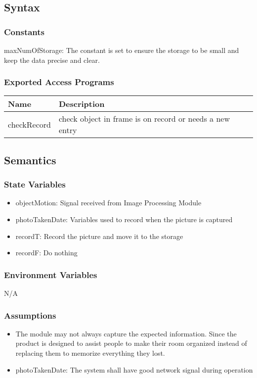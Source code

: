 \documentclass[12pt, titlepage]{article}
\begin{document}
\subsection{Syntax}

\subsubsection{Constants}
maxNumOfStorage: The constant is set to ensure the storage to be small and keep the data precise and clear.\\
\subsubsection{Exported Access Programs}

\begin{center}
\begin{tabular}{p{4cm} p{8cm} }
\hline
\textbf{Name} & \textbf{Description}  \\
\hline
checkRecord & check object in frame is on record or needs a new entry\\
\hline
\end{tabular}
\end{center}
\subsection{Semantics}

\subsubsection{State Variables}
\begin{itemize}
\item objectMotion: Signal received from Image Processing Module \\
\item photoTakenDate: Variables used to record when the picture is captured\\
\item recordT: Record the picture and move it to the storage\\
\item recordF: Do nothing\\
\end{itemize}
\subsubsection{Environment Variables}
N/A
\subsubsection{Assumptions}
\begin{itemize}
\item The module may not always capture the expected information. Since the product is designed to assist people to make their room organized instead of replacing them to memorize everything they lost.\\
\item photoTakenDate: The system shall have good network signal during operation \\
\end{itemize}
\end{document}
